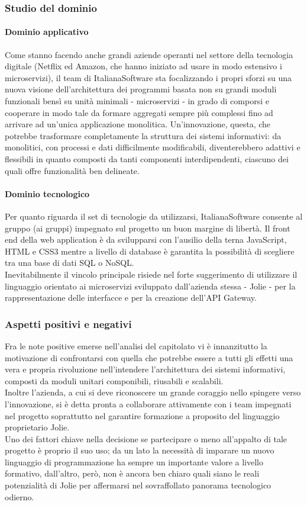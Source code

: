 		\subsubsection{Studio del dominio}
			\paragraph{Dominio applicativo}
			Come stanno facendo anche grandi aziende operanti nel settore della tecnologia digitale (Netflix ed Amazon, che hanno iniziato ad usare 
			in modo estensivo i microservizi), il team di ItalianaSoftware sta focalizzando i propri sforzi su una nuova visione dell'architettura 
			dei programmi basata non su grandi moduli funzionali bensì su unità minimali - microservizi - in grado di comporsi e cooperare in modo 
			tale da formare aggregati sempre più complessi fino ad arrivare ad un'unica applicazione monolitica. Un'innovazione, questa, che potrebbe 
			trasformare completamente la struttura dei sistemi informativi: da monolitici, con processi e dati difficilmente modificabili, diventerebbero 
			adattivi e flessibili in quanto composti da tanti componenti interdipendenti, ciascuno dei quali offre funzionalità ben delineate.
			\paragraph{Dominio tecnologico}
			Per quanto riguarda il set di tecnologie da utilizzarsi, ItalianaSoftware consente al gruppo (ai gruppi) impegnato sul progetto un buon 
			margine di libertà. Il front end della web application è da svilupparsi con l'ausilio della terna JavaScript, HTML e CSS3 mentre a 
			livello di database è garantita la possibilità di scegliere tra una base di dati SQL o NoSQL.\\
			Inevitabilmente il vincolo principale risiede nel forte suggerimento di utilizzare il linguaggio orientato ai microservizi sviluppato 
			dall'azienda stessa - Jolie - per la rappresentazione delle interfacce e per la creazione dell'API Gateway.
		\subsubsection{Aspetti positivi e negativi}
		Fra le note positive emerse nell'analisi del capitolato vi è innanzitutto la motivazione di confrontarsi con quella che potrebbe essere 
		a tutti gli effetti una vera e propria rivoluzione nell'intendere l'architettura dei sistemi informativi, composti da moduli unitari 
		componibili, riusabili e scalabili.\\
		Inoltre l'azienda, a cui si deve riconoscere un grande coraggio nello spingere verso l'innovazione, si è detta pronta a collaborare attivamente 
		con i team impegnati nel progetto soprattutto nel garantire formazione a proposito del linguaggio proprietario Jolie.\\
		Uno dei fattori chiave nella decisione se partecipare o meno all'appalto di tale progetto è proprio il suo uso; da un lato la necessità di 
		imparare un nuovo linguaggio di programmazione ha sempre un importante valore a livello formativo, dall'altro, però, non è ancora ben chiaro 
		quali siano le reali potenzialità di Jolie per affermarsi nel sovraffollato panorama tecnologico odierno.

